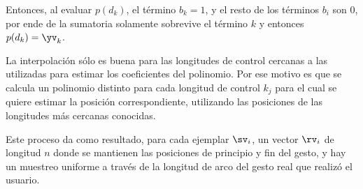 
Entonces, al evaluar $p(d_k)$, el término $b_k=1$, y el resto de los términos $b_i$ son 0, por ende de la sumatoria solamente sobrevive el término $k$ y entonces $p(d_k)=\yv_k$.

La interpolación sólo es buena para las longitudes de control cercanas a las utilizadas para estimar los coeficientes del polinomio. Por ese motivo es que se calcula un polinomio distinto para cada longitud de control $k_j$ para el cual se quiere estimar la posición correspondiente, utilizando las posiciones de las longitudes más cercanas conocidas.


Este proceso da como resultado, para cada ejemplar $\sv_i$, un vector $\rv_i$ de longitud $n$ donde se mantienen las posiciones de principio y fin del gesto, y hay un muestreo uniforme a través de la longitud de arco del gesto real que realizó el usuario.